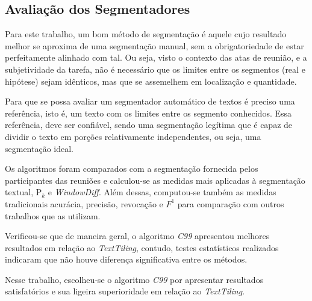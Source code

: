 





\subsection{Avaliação dos Segmentadores}




Para este trabalho, um bom método de segmentação é aquele cujo resultado melhor se aproxima de uma segmentação manual, sem a obrigatoriedade de estar perfeitamente alinhado com tal. Ou seja, visto o contexto das atas de reunião, e a subjetividade da tarefa, não é necessário que os limites entre os segmentos (real e hipótese) sejam idênticos, mas que se assemelhem em localização e quantidade.

Para que se possa avaliar um segmentador automático de textos é preciso uma referência, isto é, um texto com os limites entre os segmento conhecidos. Essa referência, deve ser confiável, sendo uma segmentação legítima que é capaz de dividir o texto em porções relativamente independentes, ou seja, uma segmentação ideal.

Os algoritmos foram comparados com a segmentação fornecida pelos participantes das reuniões e calculou-se as medidas mais aplicadas à segmentação textual, P$_k$ e \textit{WindowDiff}. Além dessas, computou-se também as medidas tradicionais acurácia, precisão, revocação e $F^1$ para comparação com outros trabalhos que as utilizam.

Verificou-se que de maneira geral, o algoritmo \textit{C99} apresentou melhores resultados em relação ao \textit{TextTiling}, contudo, testes estatísticos realizados indicaram que não houve diferença significativa entre os métodos. 







Nesse trabalho, escolheu-se o algoritmo \textit{C99} por apresentar resultados satisfatórios e sua ligeira superioridade em relação ao \textit{TextTiling}. 




